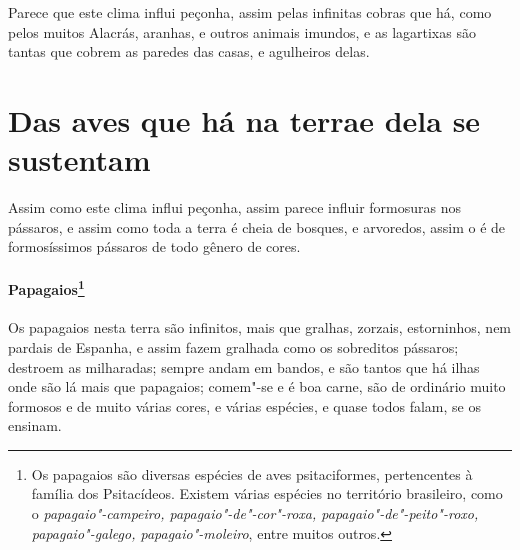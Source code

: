  Parece que este clima influi peçonha, assim pelas infinitas cobras que
há, como pelos muitos Alacrás, aranhas, e outros animais imundos, e as
lagartixas são tantas que cobrem as paredes das casas, e agulheiros
delas.

\section[Das aves que há na terra e dela se sustentam]{Das aves que há na terra\break e dela se sustentam}
Assim como este clima influi peçonha, assim parece influir
formosuras nos pássaros, e assim como toda a terra é cheia de bosques,
e arvoredos, assim o é de formosíssimos pássaros de todo gênero de
cores.

\paragraph{Papagaios\footnote{ Os papagaios são diversas espécies de
aves psitaciformes, pertencentes à família dos Psitacídeos. Existem
várias espécies no território brasileiro, como o
\textit{papagaio"-campeiro, papagaio"-de"-cor"-roxa,
papagaio"-de"-peito"-roxo, papagaio"-galego, papagaio"-moleiro}, entre
muitos outros.}} Os papagaios nesta terra são infinitos, mais
que gralhas, zorzais, estorninhos, nem pardais de Espanha, e assim
fazem gralhada como os sobreditos pássaros; destroem as milharadas;
sempre andam em bandos, e são tantos que há ilhas onde são lá mais que
papagaios; comem"-se e é boa carne, são de ordinário muito formosos e de
muito várias cores, e várias espécies, e quase todos falam, se os
ensinam.

